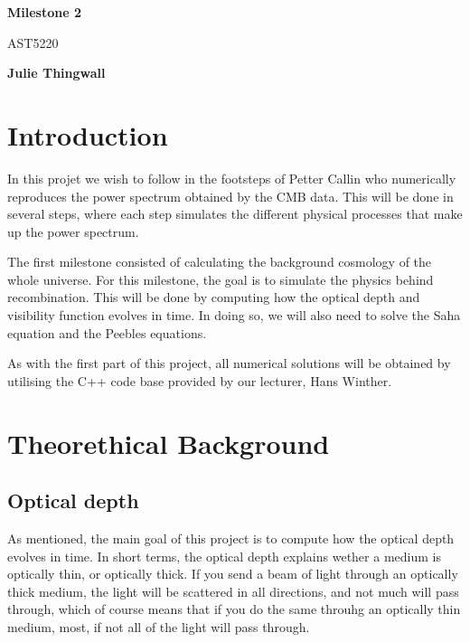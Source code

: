 \documentclass[12pt]{article}
\begin{document}
    \begin{titlepage}
        \begin{center}
            \vspace*{5cm}
            
            \Huge
            \textbf{Milestone 2}
            
            \vspace*{0.5cm}
            \LARGE
            AST5220
        
            \vspace*{0.5cm}
        
            \textbf{Julie Thingwall}
        \end{center}
    \end{titlepage}

\section{Introduction}
In this projet we wish to follow in the footsteps of Petter Callin\cite{callin2006calculate} who numerically reproduces the power spectrum obtained by the CMB data. This will be done in several steps, where each step simulates the different physical processes that make up the power spectrum.

The first milestone consisted of calculating the background cosmology of the whole universe. For this milestone, the goal is to simulate the physics behind recombination. This will be done by computing how the optical depth and visibility function evolves in time. In doing so, we will also need to solve the Saha equation and the Peebles equations.

As with the first part of this project, all numerical solutions will be obtained by utilising the C++ code base provided by our lecturer, Hans Winther.

\section{Theorethical Background}
\subsection{Optical depth}
As mentioned, the main goal of this project is to compute how the optical depth evolves in time. In short terms, the optical depth explains wether a medium is optically thin, or optically thick. If you send a beam of light through an optically thick medium, the light will be scattered in all directions, and not much will pass through, which of course means that if you do the same throuhg an optically thin medium, most, if not all of the light will pass through. 
\end{document}
